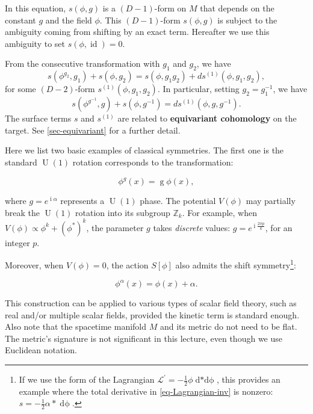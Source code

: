 \documentclass[11pt,toc=bibliography]{scrbook}
\DeclareMathOperator{\U}{U}
\DeclareMathOperator{\imunit}{i}
\DeclareMathOperator{\id}{id}
\newcommand{\stdim}{D}
\numberwithin{equation}{section}
\begin{document}
In this equation, $s(\phi,g)$ is a $(\stdim-1)$-form on $M$ that depends on the constant $g$ and the field $\phi$. 
This $(D-1)$-form $s(\phi,g)$ is subject to the ambiguity coming from shifting by an exact term. Hereafter we use this ambiguity to set $s(\phi,\id)=0$.

From the consecutive transformation with $g_1$ and $g_2$, we have
\begin{equation}
s(\phi^{g_2},g_1) + s(\phi,g_2) = s(\phi,g_1g_2) + ds^{(1)}(\phi,g_1,g_2),
\label{eq-surface-term-assosiative}
\end{equation}
for some $(D-2)$-form $s^{(1)}(\phi,g_1,g_2)$.
In particular, setting $g_2=g_1^{-1}$, we have 
\begin{equation}
s(\phi^{g^{-1}},g) + s(\phi,g^{-1})  = ds^{(1)}(\phi, g, g^{-1}).
\label{eq-surface-term-inverse}
\end{equation}
The surface terms $s$ and $s^{(1)}$ are related to \textbf{equivariant cohomology} on the target.
See \ref{sec-equivariant} for a further detail.

Here we list two basic examples of classical symmetries.
The first one is the standard $\U(1)$ rotation corresponds to the transformation:

\begin{equation}
\phi^g(x) = \mathop{g} \phi(x),
\end{equation}

where $g=e^{\imunit \alpha}$ represents a $\U(1)$ phase. The potential $V(\phi)$ may partially break the $\U(1)$ rotation into its subgroup $\mathbb{Z}_k$. For example, when $V(\phi)\propto \phi^k+(\phi^*)^k$, the parameter $g$ takes \textit{discrete} values: $g = e^{\imunit \frac{2\pi p}{k}}$, for an integer $p$.

Moreover, when $V(\phi)=0$, the action $S[\phi]$ also admits the shift symmetry\footnote{If we use the form of the Lagrangian $\mathcal{L}^\prime= -\frac12 \phi \mathop{d*d\phi}$, this provides an example where the total derivative in \eqref{eq-Lagrangian-inv} is nonzero: $s=-\frac12 \alpha \mathop{*}\mathop{d\phi}$.}:

\begin{equation}
\phi^{\alpha}(x) = \phi(x) + \alpha.
\end{equation}

\begin{note}{}
This construction can be applied to various types of scalar field theory, such as real and/or multiple scalar fields, provided the kinetic term is standard enough. Also note that the spacetime manifold $M$ and its metric do not need to be flat. The metric's signature is not significant in this lecture, even though we use Euclidean notation.
\end{note}
\end{document}
